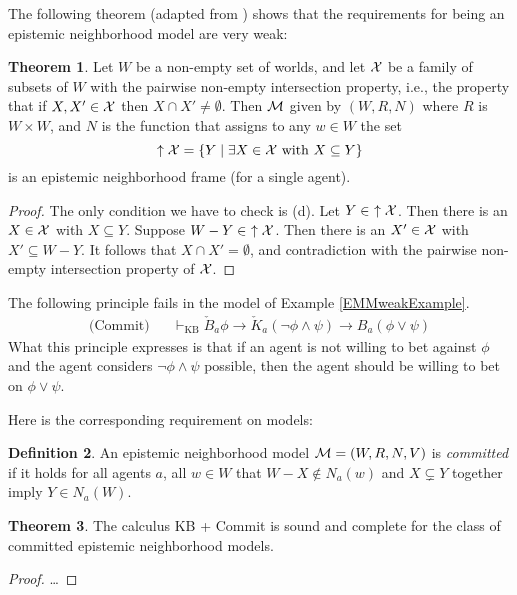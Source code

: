 \documentclass[12pt]{article}
\theoremstyle{definition}
\newtheorem{theorem}{Theorem}[section]
\newtheorem{definition}[theorem]{Definition}
\newcommand{\M}{{\cal M}}      %
\begin{document}
The following theorem (adapted from \cite{WalleyFine1979:vomacp})
shows that the requirements for being an epistemic neighborhood model 
are very weak: 

\begin{theorem} \label{pneiModel}
  Let $W$ be a non-empty set of worlds, and let ${\cal X}$ be a family
  of subsets of $W$ with the pairwise non-empty intersection property,
  i.e., the property that if $X,X' \in {\cal X}$ then $X \cap X' \neq
  \emptyset$. Then $\M$ given by $(W,R,N)$ where $R$ is $W\times W$,
  and $N$ is the function that assigns to any $w \in W$ the set
\[
 \uparrow {\cal X} = 
 \{ Y \mid \exists X \in {\cal X} \text{ with } X \subseteq Y \}
\]
is an epistemic neighborhood frame (for a single agent). 
\end{theorem}
\begin{proof}
The only condition we have to check is (d). Let $Y \in \ \uparrow {\cal X}$. 
Then there is an $X \in {\cal X}$ with $X \subseteq Y$. 
Suppose $W-Y \in \ \uparrow {\cal X}$. Then there is an $X' \in {\cal X}$ 
with $X' \subseteq W - Y$. It follows that $X \cap X' = \emptyset$, and 
contradiction with the pairwise non-empty intersection property of ${\cal X}$. 
\end{proof}

The following principle fails in the model of Example \ref{EMMweakExample}. 
\begin{eqnarray*}
\text{(Commit)} & & \vdash_{\text{KB}} \check{B}_a \phi \rightarrow
  \check{K}_a(\neg \phi \land \psi) \rightarrow B_a (\phi \lor \psi) 
\end{eqnarray*}
What this principle expresses is that if an agent is not willing to bet 
against $\phi$ and the agent considers $\neg \phi \land \psi$ possible, 
then the agent should be willing to bet on $\phi \lor \psi$. 

Here is the corresponding requirement on models: 

\begin{definition} \label{commitment}
An epistemic neighborhood model $\M = (W,R,N,V)$ is {\em committed} if 
it holds for all agents $a$, all $w \in W$ that $W - X \notin N_a(w)$ 
and $X \subsetneq Y$ together imply $Y \in N_a(W)$. 
\end{definition}

\begin{theorem} \label{completeCommit}
The calculus KB + Commit is sound and complete for the class of 
committed epistemic neighborhood models. 
\end{theorem} 
\begin{proof}
\ldots
\end{proof}
\end{document}
